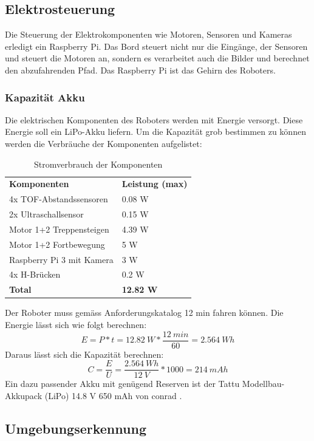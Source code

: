 \newpage
\subsection{Elektrosteuerung}
Die Steuerung der Elektrokomponenten wie Motoren, Sensoren und Kameras erledigt ein Raspberry Pi. Das Bord steuert nicht nur die Eingänge, der Sensoren und steuert die Motoren an, sondern es verarbeitet auch die Bilder und berechnet den abzufahrenden Pfad. Das Raspberry Pi ist das Gehirn des Roboters.

\subsubsection{Kapazität Akku}
Die elektrischen Komponenten des Roboters werden mit Energie versorgt. Diese Energie soll ein LiPo-Akku liefern. Um die Kapazität grob bestimmen zu können werden die Verbräuche der Komponenten aufgelistet:   

\begin{table}[h!]
\centering
\begin{tabular}{ l l }
 \textbf{Komponenten} & \textbf{Leistung (max)} \\
 4x TOF-Abstandssensoren & 0.08 W \\ 
 2x Ultraschallsensor & 0.15 W \\
 Motor 1+2 Treppensteigen & 4.39 W \\  
 Motor 1+2 Fortbewegung & 5 W \\
 Raspberry Pi 3 mit Kamera & 3 W \\
 4x H-Brücken & 0.2 W \\
 \textbf{Total} & \textbf{12.82 W}
\end{tabular}
\caption{Stromverbrauch der Komponenten}
\end{table}

Der Roboter muss gemäss Anforderungskatalog 12 min fahren können. Die Energie lässt sich wie folgt berechnen:
\[E = P * t = 12.82\ W * \frac{12\ min}{60} = 2.564\ Wh\]
Daraus lässt sich die Kapazität berechnen:
\[C = \frac{E}{U} = \frac{2.564\ Wh}{12\ V} * 1000 = 214\ mAh\]
Ein dazu passender Akku mit genügend Reserven ist der Tattu Modellbau-Akkupack (LiPo) 14.8 V 650 mAh von conrad \cite{Akku}.


\newpage
\subsection{Umgebungserkennung}
